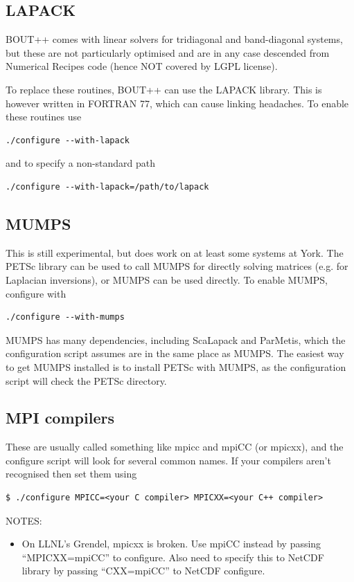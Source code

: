\documentclass[12pt]{article}
\begin{document}
\subsection{LAPACK}
%
BOUT++ comes with linear solvers for tridiagonal and band-diagonal systems, but
these are not particularly optimised and are in any case descended from
Numerical Recipes code (hence NOT covered by LGPL license).

To replace these routines, BOUT++ can use the LAPACK library. This is however
written in FORTRAN 77, which can cause linking headaches.  To enable these
routines use
%
\begin{verbatim}
./configure --with-lapack
\end{verbatim}
%
and to specify a non-standard path
%
\begin{verbatim}
./configure --with-lapack=/path/to/lapack
\end{verbatim}
%



\subsection{MUMPS}
%
\label{sec:MUMPS}
%
This is still experimental, but does work on at least some systems at York.
The PETSc library can be used to call MUMPS for directly solving matrices (e.g.
for Laplacian inversions), or MUMPS can be used directly.  To enable MUMPS,
configure with
%
\begin{verbatim}
./configure --with-mumps
\end{verbatim}
%
MUMPS has many dependencies, including ScaLapack and ParMetis, which the
configuration script assumes are in the same place as MUMPS. The easiest way to
get MUMPS installed is to install PETSc with MUMPS, as the configuration script
will check the PETSc directory.



\subsection{MPI compilers}
%
These are usually called something like mpicc and mpiCC (or mpicxx), and the
configure script will look for several common names.  If your compilers aren't
recognised then set them using
%
\begin{verbatim}
$ ./configure MPICC=<your C compiler> MPICXX=<your C++ compiler>
\end{verbatim}
%
NOTES:
%
\begin{itemize}
\item On LLNL's Grendel, mpicxx is broken. Use mpiCC instead by passing
    ``MPICXX=mpiCC'' to configure. Also need to specify this to NetCDF library
    by passing ``CXX=mpiCC'' to NetCDF configure.
\end{itemize}
%
\end{document}
